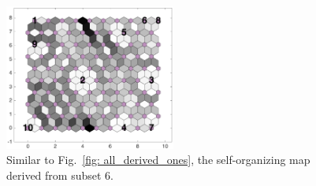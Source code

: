 \begin{figure}
        \centering
        \includegraphics[width=0.5\textwidth]{../../images0.01/M31/2D/image_subsets/subset4_dist_with_hits_t.png}
    \caption{Similar to Fig.~\ref{fig: all_derived_ones}, the self-organizing map derived  from subset 6.}
    \label{fig: subset4}
\end{figure}
